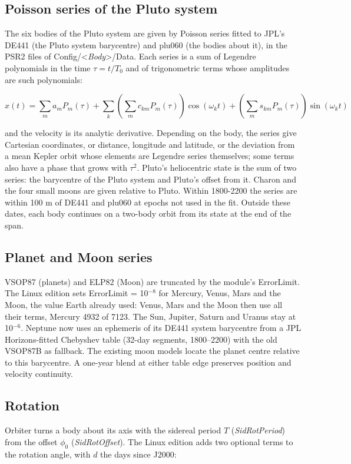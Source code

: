 \documentclass[Orbiter Technical Reference.tex]{subfiles}
\begin{document}
\begin{sloppypar}
\subsection{Poisson series of the Pluto system}
The six bodies of the Pluto system are given by Poisson series fitted to JPL's DE441 (the Pluto system barycentre) and plu060 (the bodies about it), in the PSR2 files of Config/<\textit{Body}>/Data. Each series is a sum of Legendre polynomials in the time $\tau = t/T_{0}$ and of trigonometric terms whose amplitudes are such polynomials:

\[ x(t) = \sum_{m} a_{m} P_{m}(\tau) + \sum_{k} \left( \sum_{m} c_{km} P_{m}(\tau) \right) \cos(\omega_{k} t) + \left( \sum_{m} s_{km} P_{m}(\tau) \right) \sin(\omega_{k} t) \]

\noindent
and the velocity is its analytic derivative. Depending on the body, the series give Cartesian coordinates, or distance, longitude and latitude, or the deviation from a mean Kepler orbit whose elements are Legendre series themselves; some terms also have a phase that grows with $\tau^{2}$. Pluto's heliocentric state is the sum of two series: the barycentre of the Pluto system and Pluto's offset from it. Charon and the four small moons are given relative to Pluto. Within 1800-2200 the series are within 100 m of DE441 and plu060 at epochs not used in the fit. Outside these dates, each body continues on a two-body orbit from its state at the end of the span.


\subsection{Planet and Moon series}
VSOP87 (planets) and ELP82 (Moon) are truncated by the module's ErrorLimit. The Linux edition sets ErrorLimit = 10$^{-8}$ for Mercury, Venus, Mars and the Moon, the value Earth already used: Venus, Mars and the Moon then use all their terms, Mercury 4932 of 7123. The Sun, Jupiter, Saturn and Uranus stay at 10$^{-6}$. Neptune now uses an ephemeris of its DE441 system barycentre from a JPL Horizons-fitted Chebyshev table (32-day segments, 1800--2200) with the old VSOP87B as fallback. The existing moon models locate the planet centre relative to this barycentre. A one-year blend at either table edge preserves position and velocity continuity.


\subsection{Rotation}
Orbiter turns a body about its axis with the sidereal period $T$ (\textit{SidRotPeriod}) from the offset $\phi_{0}$ (\textit{SidRotOffset}). The Linux edition adds two optional terms to the rotation angle, with $d$ the days since J2000:


\end{sloppypar}
\end{document}
